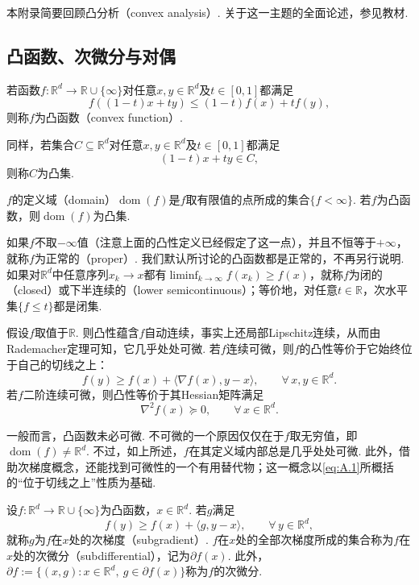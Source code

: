 本附录简要回顾凸分析（convex analysis）. 关于这一主题的全面论述，参见教材\cite{ref274}.

\subsection{凸函数、次微分与对偶}\label{sec:A.1}

\begin{definition}\label{def:A.1}
若函数$f:\mathbb R^d\to\mathbb R\cup\{\infty\}$对任意$x,y\in\mathbb R^d$及$t\in[0,1]$都满足
$$
f((1-t)x+ty)\leq(1-t)f(x)+tf(y),
$$
则称$f$为凸函数（convex function）.
\end{definition}
同样，若集合$C\subseteq\mathbb R^d$对任意$x,y\in\mathbb R^d$及$t\in[0,1]$都满足
$$
(1-t)x+ty\in C,
$$
则称$C$为凸集.

$f$的定义域（domain）$\operatorname{dom}(f)$是$f$取有限值的点所成的集合$\{f<\infty\}$. 若$f$为凸函数，则$\operatorname{dom}(f)$为凸集.

如果$f$不取$-\infty$值（注意上面的凸性定义已经假定了这一点），并且不恒等于$+\infty$，就称$f$为正常的（proper）. 我们默认所讨论的凸函数都是正常的，不再另行说明. 如果对$\mathbb R^d$中任意序列$x_k\to x$都有$\liminf_{k\to\infty}f(x_k)\geq f(x)$，就称$f$为闭的（closed）或下半连续的（lower semicontinuous）；等价地，对任意$t\in\mathbb R$，次水平集$\{f\leq t\}$都是闭集.

假设$f$取值于$\mathbb R$. 则凸性蕴含$f$自动连续，事实上还局部Lipschitz连续，从而由Rademacher定理可知，它几乎处处可微. 若$f$连续可微，则$f$的凸性等价于它始终位于自己的切线之上：
\begin{equation}\label{eq:A.1}
f(y)\geq f(x)+\langle\nabla f(x),y-x\rangle,\qquad \forall\,x,y\in\mathbb R^d.
\end{equation}
若$f$二阶连续可微，则凸性等价于其Hessian矩阵满足
$$
\nabla^2 f(x)\succeq0,\qquad\forall\,x\in\mathbb R^d.
$$

一般而言，凸函数未必可微. 不可微的一个原因仅仅在于$f$取无穷值，即$\operatorname{dom}(f)\neq\mathbb R^d$. 不过，如上所述，$f$在其定义域内部总是几乎处处可微. 此外，借助次梯度概念，还能找到可微性的一个有用替代物；这一概念以\eqref{eq:A.1}所概括的“位于切线之上”性质为基础.

\begin{definition}[次微分]\label{def:A.2}
设$f:\mathbb R^d\to\mathbb R\cup\{\infty\}$为凸函数，$x\in\mathbb R^d$. 若$g$满足
$$
f(y)\geq f(x)+\langle g,y-x\rangle,\qquad\forall\,y\in\mathbb R^d,
$$
就称$g$为$f$在$x$处的次梯度（subgradient）. $f$在$x$处的全部次梯度所成的集合称为$f$在$x$处的次微分（subdifferential），记为$\partial f(x)$. 此外，$\partial f:=\{(x,g):x\in\mathbb R^d,\ g\in\partial f(x)\}$称为$f$的次微分.
\end{definition}

